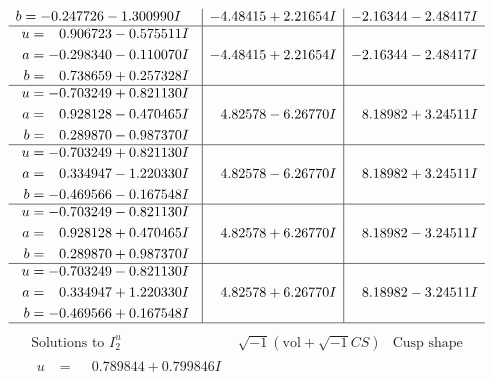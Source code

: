 \documentclass[1p]{elsarticle_modified}
\theoremstyle{definition}
\newcommand{\I}{\sqrt{-1}}
\begin{document}
$$\begin{array}{c|c|c}
\begin{aligned}
b &= -0.247726 - 1.300990 I\end{aligned}
 & -4.48415 + 2.21654 I & -2.16344 - 2.48417 I \\ \hline\begin{aligned}
u &= \phantom{-}0.906723 - 0.575511 I \\
a &= -0.298340 - 0.110070 I \\
b &= \phantom{-}0.738659 + 0.257328 I\end{aligned}
 & -4.48415 + 2.21654 I & -2.16344 - 2.48417 I \\ \hline\begin{aligned}
u &= -0.703249 + 0.821130 I \\
a &= \phantom{-}0.928128 - 0.470465 I \\
b &= \phantom{-}0.289870 - 0.987370 I\end{aligned}
 & \phantom{-}4.82578 - 6.26770 I & \phantom{-}8.18982 + 3.24511 I \\ \hline\begin{aligned}
u &= -0.703249 + 0.821130 I \\
a &= \phantom{-}0.334947 - 1.220330 I \\
b &= -0.469566 - 0.167548 I\end{aligned}
 & \phantom{-}4.82578 - 6.26770 I & \phantom{-}8.18982 + 3.24511 I \\ \hline\begin{aligned}
u &= -0.703249 - 0.821130 I \\
a &= \phantom{-}0.928128 + 0.470465 I \\
b &= \phantom{-}0.289870 + 0.987370 I\end{aligned}
 & \phantom{-}4.82578 + 6.26770 I & \phantom{-}8.18982 - 3.24511 I \\ \hline\begin{aligned}
u &= -0.703249 - 0.821130 I \\
a &= \phantom{-}0.334947 + 1.220330 I \\
b &= -0.469566 + 0.167548 I\end{aligned}
 & \phantom{-}4.82578 + 6.26770 I & \phantom{-}8.18982 - 3.24511 I\\
 \hline 
 \end{array}$$\newpage$$\begin{array}{c|c|c}  
\text{Solutions to }I^u_{2}& \I (\text{vol} + \sqrt{-1}CS) & \text{Cusp shape}\\
 \hline 
\begin{aligned}
u &= \phantom{-}0.789844 + 0.799846 I \\

\end{aligned}
\end{array}$$
\end{document}

